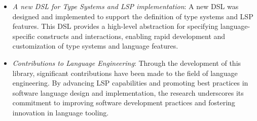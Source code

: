 \documentclass{adapt-lab}
\begin{document}
\begin{itemize}
    \item \textit{A new DSL for Type Systems and LSP implementation}: A new DSL was designed and implemented to support the definition of type systems and LSP features. This DSL provides a high-level abstraction for specifying language-specific constructs and interactions, enabling rapid development and customization of type systems and language features.
    \item \textit{Contributions to Language Engineering}: Through the development of this library, significant contributions have been made to the field of language engineering. By advancing LSP capabilities and promoting best practices in software language design and implementation, the research underscores its commitment to improving software development practices and fostering innovation in language tooling.
\end{itemize}


\begingroup
\let\clearpage\relax


\endgroup

\nocite{Cazzola20}
\nocite{Cazzola21b, Cazzola15f}
\nocite{Leduc20}
\nocite{Cazzola15c, Cazzola14c}
\nocite{Cazzola15f, Cazzola21b}
\nocite{Fowler10}
\nocite{Bettini13b}
\nocite{Barros22}
\nocite{Bunder19a}
\nocite{Rodriguez-Echeverria18a}
\nocite{Cazzola20}
\nocite{Rodriguez-Echeverria18}
\nocite{Cazzola23d, Cazzola20}
\nocite{Cazzola15f}
\nocite{Cazzola15f}
\nocite{Cazzola16, Cazzola16i, Cazzola15f}
\nocite{Haugen08, Cazzola14e, White09}
\nocite{Wende09}
\nocite{Cazzola15c, Cazzola14c}
\nocite{Cazzola19}

%
% 
% 
\end{document}
